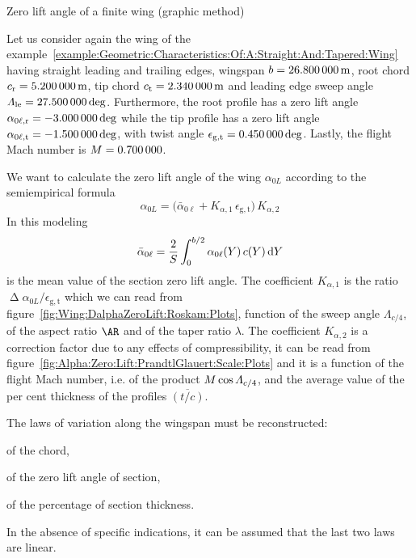 \documentclass[[12pt,twoside]{book}
\begin{document}
%
\begin{myExampleX}{Zero lift angle of a finite wing (graphic method)}{\ \myIconGraph\ }%
\label{example:Zero:Lift:Angle:Graphic:Method}
%

%
\noindent
Let us consider again the wing of the example~\ref{example:Geometric:Characteristics:Of:A:Straight:And:Tapered:Wing} having straight leading and trailing edges, wingspan $b=\SI[round-precision=1]{\mySpanWingMT}{\metre}$, root chord $c_\mathrm{r}=\SI[round-precision=2]{\myChordRootWingMT}{\metre}$,
tip chord $c_\mathrm{t}=\SI[round-precision=2]{\myChordTipWingMT}{\metre}$
and leading edge sweep angle $\Lambda_\mathrm{le}=\SI[round-precision=1]{\mySweepLEWingDEG}{\deg}$.
Furthermore, the root profile has a zero lift angle
$\alpha_{0\ell,\mathrm{r}}=\SI[round-precision=1]{\myAlphaZeroLiftRootWingDEG}{\deg}$
while the tip profile has a zero lift angle
$\alpha_{0\ell,\mathrm{t}}=\SI[round-precision=1]{\myAlphaZeroLiftTipWingDEG}{\deg}$,
with twist angle
$\epsilon_{\mathrm{g,t}}=\SI[round-precision=1]{\myTwistWingDEG}{\deg}$.
Lastly, the flight Mach number is $\Mach=\SI[round-precision=2]{\myMach}{}$.

We want to calculate the zero lift angle of the wing $\alpha_{0L}$ 
according to the semiempirical formula
\begin{equation}
\label{eq:Wing:Alpha:Zero:Lift:Roskam:Datcom}
\alpha_{0L} =
  \Big(
    \bar{\alpha}_{0\ell} + K_{\alpha,1} \, \epsilon_{\mathrm{g,t}}
  \Big) 
  \, K_{\alpha,2}
\end{equation}
In this modeling
\[
\bar{\alpha}_{0\ell} = \frac{2}{S} \int_0^{b/2} \alpha_{0\ell}(Y)\, c(Y) \diff{Y}
\]
is the mean value of the section zero lift angle.
The coefficient
$K_{\alpha,1}$ is the ratio
$\upDelta\alpha_{0L}/\epsilon_{\mathrm{g,t}}$ which we can read from
figure~\ref{fig:Wing:DalphaZeroLift:Roskam:Plots},
function of the sweep angle $\Lambda_{c/4}$, of the aspect ratio $\AR$
and of the taper ratio $\lambda$.
The coefficient
$K_{\alpha,2}$ is a correction factor due to any
effects of compressibility, it can be read from figure~\ref{fig:Alpha:Zero:Lift:PrandtlGlauert:Scale:Plots}
and it is a function of the flight Mach number, i.e. of the product $\Mach\cos\Lambda_{c/4}$,
and the average value of the per cent thickness of the profiles $\overline{(t/c)}$.

\medskip

The laws of variation along the wingspan must be reconstructed:  %
\begin{inparaenum}
\item
of the chord,
\item
of the zero lift angle of section,
\item
of the percentage of section thickness.
\end{inparaenum}
In the absence of specific indications, it can be assumed
that the last two laws are linear.


\end{myExampleX}
\end{document}
